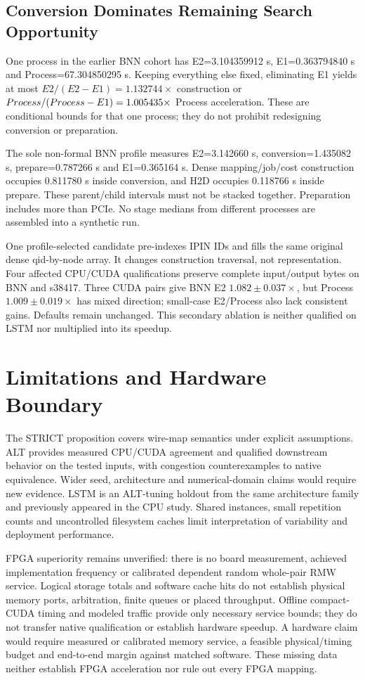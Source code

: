 \documentclass[conference,10pt,letterpaper]{IEEEtran}
\begin{document}
\subsection{Conversion Dominates Remaining Search Opportunity}
One process in the earlier BNN cohort has E2=3.104359912 s, E1=0.363794840 s and Process=67.304850295 s. Keeping everything else fixed, eliminating E1 yields at most $E2/(E2-E1)=1.132744\times$ construction or $Process/(Process-E1)=1.005435\times$ Process acceleration. These are conditional bounds for that one process; they do not prohibit redesigning conversion or preparation.

The sole non-formal BNN profile measures E2=3.142660 s, conversion=1.435082 s, prepare=0.787266 s and E1=0.365164 s. Dense mapping/job/cost construction occupies 0.811780 s inside conversion, and H2D occupies 0.118766 s inside prepare. These parent/child intervals must not be stacked together. Preparation includes more than PCIe. No stage medians from different processes are assembled into a synthetic run.

One profile-selected candidate pre-indexes IPIN IDs and fills the same original dense qid-by-node array. It changes construction traversal, not representation. Four affected CPU/CUDA qualifications preserve complete input/output bytes on BNN and s38417. Three CUDA pairs give BNN E2 $1.082\pm0.037\times$, but Process $1.009\pm0.019\times$ has mixed direction; small-case E2/Process also lack consistent gains. Defaults remain unchanged. This secondary ablation is neither qualified on LSTM nor multiplied into its speedup.

\section{Limitations and Hardware Boundary}
The STRICT proposition covers wire-map semantics under explicit assumptions. ALT provides measured CPU/CUDA agreement and qualified downstream behavior on the tested inputs, with congestion counterexamples to native equivalence. Wider seed, architecture and numerical-domain claims would require new evidence. LSTM is an ALT-tuning holdout from the same architecture family and previously appeared in the CPU study. Shared instances, small repetition counts and uncontrolled filesystem caches limit interpretation of variability and deployment performance.

FPGA superiority remains unverified: there is no board measurement, achieved implementation frequency or calibrated dependent random whole-pair RMW service. Logical storage totals and software cache hits do not establish physical memory ports, arbitration, finite queues or placed throughput. Offline compact-CUDA timing and modeled traffic provide only necessary service bounds; they do not transfer native qualification or establish hardware speedup. A hardware claim would require measured or calibrated memory service, a feasible physical/timing budget and end-to-end margin against matched software. These missing data neither establish FPGA acceleration nor rule out every FPGA mapping.
\end{document}
